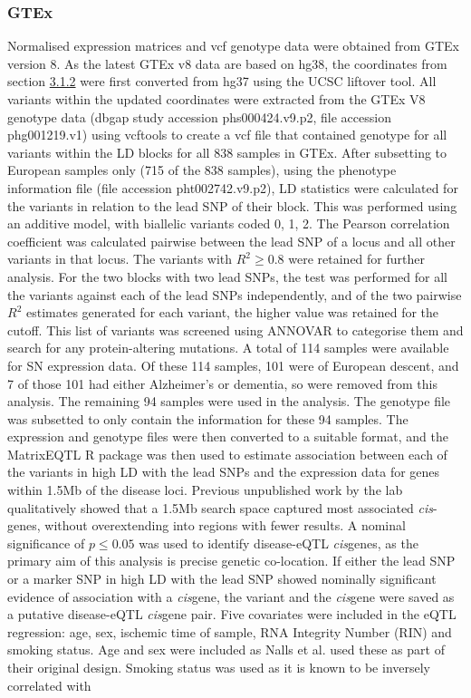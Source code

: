 \documentclass{article}
\begin{document}
\subsubsection{GTEx}
\label{subsec:GTEx}
Normalised expression matrices and vcf genotype data were obtained from GTEx version 8. As the latest GTEx v8 data are based on hg38, the coordinates from section \hyperref[subsubsec:LDblock]{3.1.2} were first converted from hg37 using the UCSC liftover tool\cite{Hinrichs2006The2006.}. All variants within the updated coordinates were extracted from the GTEx V8 genotype data (dbgap study accession phs000424.v9.p2, file accession phg001219.v1) using vcftools\cite{Danecek2011TheVCFtools} to create a vcf file that contained genotype for all variants within the LD blocks for all 838 samples in GTEx. After subsetting to European samples only (715 of the 838 samples), using the phenotype information file (file accession pht002742.v9.p2), LD statistics were calculated for the variants in relation to the lead SNP of their block. This was performed using an additive model, with biallelic variants coded 0, 1, 2. The Pearson correlation coefficient was calculated pairwise between the lead SNP of a locus and all other variants in that locus. The variants with $R^2\geq0.8$ were retained for further analysis. For the two blocks with two lead SNPs, the test was performed for all the variants against each of the lead SNPs independently, and of the two pairwise $R^2$ estimates generated for each variant, the higher value was retained for the cutoff. This list of variants was screened using ANNOVAR\cite{Wang2010ANNOVAR:Data} to categorise them and search for any protein-altering mutations. A total of 114 samples were available for SN expression data. Of these 114 samples, 101 were of European descent, and  7 of those 101 had either Alzheimer's or dementia, so were removed from this analysis. The remaining 94 samples were used in the analysis. The genotype file was subsetted to only contain the information for these 94 samples. The expression and genotype files were then converted to a suitable format, and the MatrixEQTL R package\cite{Shabalin2012MatrixOperations.} was then used to estimate association between each of the variants in high LD with the lead SNPs and the expression data for genes within 1.5Mb of the disease loci. Previous unpublished work by the lab qualitatively showed that a 1.5Mb search space captured most associated \textit{cis}-genes, without overextending into regions with fewer results. A nominal significance of $p\leq0.05$ was used to identify disease-eQTL \textit{cis}genes, as the primary aim of this analysis is precise genetic co-location. If either the lead SNP or a marker SNP in high LD with the lead SNP showed nominally significant evidence of association with a \textit{cis}gene, the variant and the \textit{cis}gene were saved as a putative disease-eQTL \textit{cis}gene pair. Five covariates were included in the eQTL regression: age, sex, ischemic time of sample, RNA Integrity Number (RIN) and smoking status. Age and sex were included as Nalls et al.\cite{Nalls2019IdentificationStudies} used these as part of their original design. Smoking status was used as it is known to be inversely correlated with 
\end{document}

